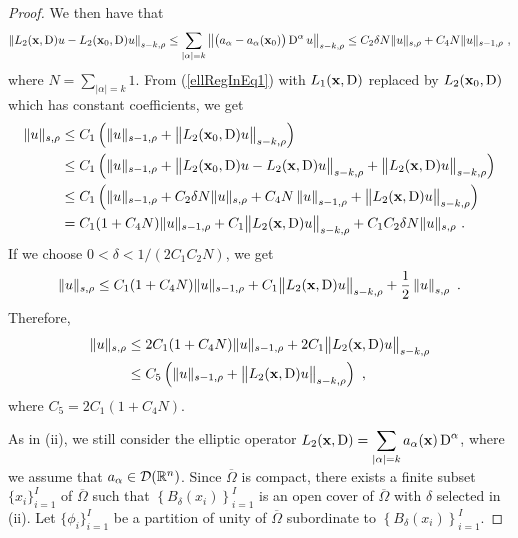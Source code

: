 \begin{proof}
We then have that
\[
\left\| L_2(\mathbf{x},\operatorname{D}) u - L_2(\mathbf{x}_0,\operatorname{D}) u\right\|_{s-k,\rho}
\leq \sum_{|\alpha|=k} \left\| \big(a_\alpha - a_\alpha(\mathbf{x}_0)\big)
\operatorname{D}^\alpha u \right\|_{s-k,\rho}
\leq C_2 \delta N \| u \|_{s,\rho}
+C_4 N \| u \|_{s-1,\rho} \ ,
\]
where $\displaystyle N = \sum_{|\alpha|=k} 1$.  From
(\ref{ellRegInEq1}) with $L_1(\mathbf{x},\operatorname{D})$ replaced by
$L_2(\mathbf{x}_0,\operatorname{D})$ which has constant coefficients, we get
\begin{align*}
\|u\|_{s,\rho}
&\leq C_1 \left( \|u\|_{s-1,\rho} +
\big\|L_2(\mathbf{x}_0,\operatorname{D})u\big\|_{s-k,\rho}\right) \\
&\leq C_1 \left( \|u\|_{s-1,\rho} +
\big\|L_2(\mathbf{x}_0,\operatorname{D})u - L_2(\mathbf{x},\operatorname{D})u\big\|_{s-k,\rho}
+\big\|L_2(\mathbf{x},\operatorname{D})u\big\|_{s-k,\rho}\right) \\
&\leq C_1 \left( \|u\|_{s-1,\rho} + C_2 \delta N \| u \|_{s,\rho}
+C_4 N \left\| u \right\|_{s-1,\rho} 
+\big\|L_2(\mathbf{x},\operatorname{D})u\big\|_{s-k,\rho}\right) \\
& = C_1 (1+C_4 N) \|u\|_{s-1,\rho} +
C_1 \big\|L_2(\mathbf{x},\operatorname{D})u\big\|_{s-k,\rho}
+ C_1 C_2 \delta N \| u \|_{s,\rho} \ .
\end{align*}
If we choose $0<\delta < 1/(2C_1C_2 N)$, we get
\[
\|u\|_{s,\rho}
\leq C_1 (1+C_4 N) \|u\|_{s-1,\rho} +
C_1 \big\|L_2(\mathbf{x},\operatorname{D})u\big\|_{s-k,\rho}
+ \frac{1}{2} \left\| u \right\|_{s,\rho} \ .
\]
Therefore,
\begin{equation} \label{ellRegInEq3}
\begin{split}
\|u\|_{s,\rho}
&\leq 2 C_1 (1+C_4 N) \|u\|_{s-1,\rho} +
2C_1 \big\|L_2(\mathbf{x},\operatorname{D})u\big\|_{s-k,\rho} \\
&\leq C_5 \left( \|u\|_{s-1,\rho} +
\big\|L_2(\mathbf{x},\operatorname{D})u\big\|_{s-k,\rho} \right) \ ,
\end{split}
\end{equation}
where $\displaystyle C_5 = 2C_1(1+C_4N)$.

 As in (ii), we still consider the elliptic operator
$\displaystyle L_2(\mathbf{x},\operatorname{D})
= \sum_{|\alpha|= k} a_\alpha(\mathbf{x}) \operatorname{D}^\alpha$,
where we assume that $a_\alpha \in \mathcal{D}(\mathbb{R}^n)$.
Since $\overline{\Omega}$ is compact, there exists a finite subset 
$\displaystyle \{x_i\}_{i=1}^I$ of $\overline{\Omega}$ such that
$\displaystyle \left\{B_\delta(x_i)\right\}_{i=1}^I$ is an open cover
of $\overline{\Omega}$ with $\delta$ selected in (ii).  Let
$\displaystyle \{\phi_i\}_{i=1}^I$ be a
partition of unity of $\overline{\Omega}$ subordinate to
$\displaystyle \left\{B_\delta(x_i)\right\}_{i=1}^I$.


\end{proof}
